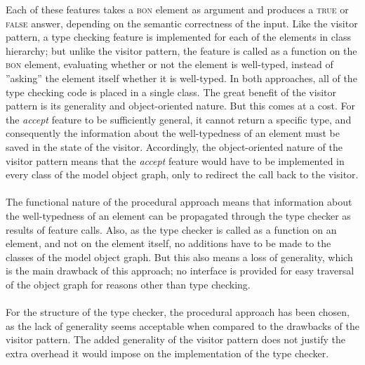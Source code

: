 Each of these features takes a \textsc{bon} element as argument and produces a \textsc{true} or \textsc{false} answer, depending on the semantic correctness of the input. Like the visitor pattern, a type checking feature is implemented for each of the elements in class hierarchy; but unlike the visitor pattern, the feature is called as a function on the \textsc{bon} element, evaluating whether or not the element is well-typed, instead of ''asking'' the element itself whether it is well-typed.
In both approaches, all of the type checking code is placed in a single class. The great benefit of the visitor pattern is its generality and object-oriented nature. But this comes at a cost. For the \textit{accept} feature to be sufficiently general, it cannot return a specific type, and consequently the information about the well-typedness of an element must be saved in the state of the visitor. Accordingly, the object-oriented nature of the visitor pattern means that the \textit{accept} feature would have to be implemented in every class of the model object graph, only to redirect the call back to the visitor.
\paragraph{} The functional nature of the procedural approach means that information about the well-typedness of an element can be propagated through the type checker as results of feature calls. Also, as the type checker is called as a function on an element, and not on the element itself, no additions have to be made to the classes of the model object graph. But this also means a loss of generality, which is the main drawback of this approach; no interface is provided for easy traversal of the object graph for reasons other than type checking.
\paragraph{} For the structure of the type checker, the procedural approach has been chosen, as the lack of generality seems acceptable when compared to the drawbacks of the visitor pattern. The added generality of the visitor pattern does not justify the extra overhead it would impose on the implementation of the type checker.

